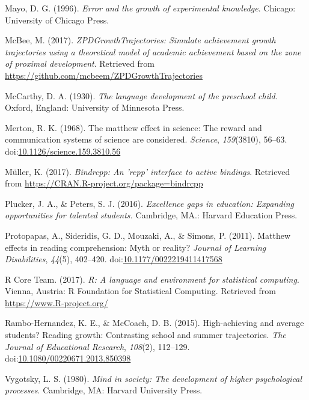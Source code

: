 \documentclass[english,floatsintext,jou]{apa6}
\theoremstyle{definition}
\theoremstyle{definition}
\theoremstyle{definition}
\theoremstyle{remark}
\begin{document}
\hypertarget{ref-mayo}{}
Mayo, D. G. (1996). \emph{Error and the growth of experimental
knowledge}. Chicago: University of Chicago Press.

\hypertarget{ref-R-ZPDGrowthTrajectories}{}
McBee, M. (2017). \emph{ZPDGrowthTrajectories: Simulate achievement
growth trajectories using a theoretical model of academic achievement
based on the zone of proximal development}. Retrieved from
\url{https://github.com/mcbeem/ZPDGrowthTrajectories}

\hypertarget{ref-mccarthy}{}
McCarthy, D. A. (1930). \emph{The language development of the preschool
child.} Oxford, England: University of Minnesota Press.

\hypertarget{ref-merton}{}
Merton, R. K. (1968). The matthew effect in science: The reward and
communication systems of science are considered. \emph{Science},
\emph{159}(3810), 56--63.
doi:\href{https://doi.org/10.1126/science.159.3810.56}{10.1126/science.159.3810.56}

\hypertarget{ref-R-bindrcpp}{}
Müller, K. (2017). \emph{Bindrcpp: An 'rcpp' interface to active
bindings}. Retrieved from
\url{https://CRAN.R-project.org/package=bindrcpp}

\hypertarget{ref-plucker}{}
Plucker, J. A., \& Peters, S. J. (2016). \emph{Excellence gaps in
education: Expanding opportunities for talented students.} Cambridge,
MA.: Harvard Education Press.

\hypertarget{ref-protopapas}{}
Protopapas, A., Sideridis, G. D., Mouzaki, A., \& Simons, P. (2011).
Matthew effects in reading comprehension: Myth or reality? \emph{Journal
of Learning Disabilities}, \emph{44}(5), 402--420.
doi:\href{https://doi.org/10.1177/0022219411417568}{10.1177/0022219411417568}

\hypertarget{ref-R-base}{}
R Core Team. (2017). \emph{R: A language and environment for statistical
computing}. Vienna, Austria: R Foundation for Statistical Computing.
Retrieved from \url{https://www.R-project.org/}

\hypertarget{ref-rambo}{}
Rambo-Hernandez, K. E., \& McCoach, D. B. (2015). High-achieving and
average students? Reading growth: Contrasting school and summer
trajectories. \emph{The Journal of Educational Research}, \emph{108}(2),
112--129.
doi:\href{https://doi.org/10.1080/00220671.2013.850398}{10.1080/00220671.2013.850398}

\hypertarget{ref-vygotsky}{}
Vygotsky, L. S. (1980). \emph{Mind in society: The development of higher
psychological processes}. Cambridge, MA: Harvard University Press.
\end{document}
